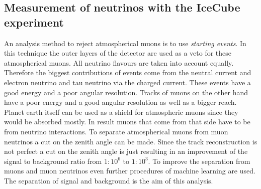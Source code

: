 \subsection{Measurement of neutrinos with the IceCube experiment}
An analysis method to reject atmospherical muons is to use \textit{starting events}.
In this technique the outer layers of the detector are used as a veto for these atmospherical muons.
All neutrino flavours are taken into account equally.
Therefore the biggest contributions of events come from the neutral current and electron neutrino and tau neutrino via the charged current.
These events have a good energy and a poor angular resolution.
Tracks of muons on the other hand have a poor energy and a good angular resolution as well as a bigger reach.
Planet earth itself can be used as a shield for atmospheric muons since they would be absorbed mostly.
In result muons that come from that side have to be from neutrino interactions.
To separate atmospherical muons from muon neutrinos a cut on the zenith angle can be made.
Since the track reconstruction is not perfect a cut on the zenith angle is just resulting in an improvement of the signal to background ratio from $1\!:\!10^6$ to $1\!:\!10^3$.
To improve the separation from muons and muon neutrinos even further procedures of machine learning are used.
The separation of signal and background is the aim of this analysis.
